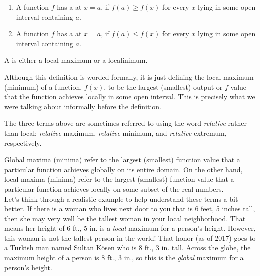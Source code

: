 \documentclass{ximera}
\begin{document}
\begin{definition}\hfil{}
\begin{enumerate}
\item A function $f$ has a  at $x=a$, if $f(a) \ge
  f(x)$ for every $x$ lying in some open interval containing $a$.
\item A function $f$ has a  at $x=a$, if $f(a) \le
  f(x)$ for every $x$ lying in some open interval containing $a$.
\end{enumerate}
A  is either a local
maximum or a localinimum.
\end{definition}

\begin{explanation}
Although this definition is worded formally, it is just defining the local maximum (minimum) of a function, $f(x)$, to be the largest (smallest) output or $f$-value that the function achieves locally in some open interval.  This is precisely what we were talking about informally before the definition.
\end{explanation}

\begin{warning}
The three terms above are sometimes referred to using the word \textit{relative} rather than local: \textit{relative} maximum, \textit{relative} minimum, and \textit{relative} extremum, respectively.
\end{warning}

\begin{example}
Global maxima (minima) refer to the largest (smallest) function value that a particular function achieves globally on its entire domain.  On the other hand, local maxima (minima) refer to the largest (smallest) function value that a particular function achieves locally on some subset of the real numbers.  \\

Let's think through a realistic example to help understand these terms a bit better.  If there is a woman who lives next door to you that is 6 feet, 5 inches tall, then she may very well be the tallest woman in your local neighborhood.  That means her height of 6 ft., 5 in. is a \textit{local} maximum for a person's height.  However, this woman is not the tallest person in the world!  That honor (as of 2017) goes to a Turkish man named Sultan K{\"o}sen who is 8 ft., 3 in. tall.  Across the globe, the maximum height of a person is 8 ft., 3 in., so this is the \textit{global} maximum for a person's height.   

\end{example}
\end{document}
